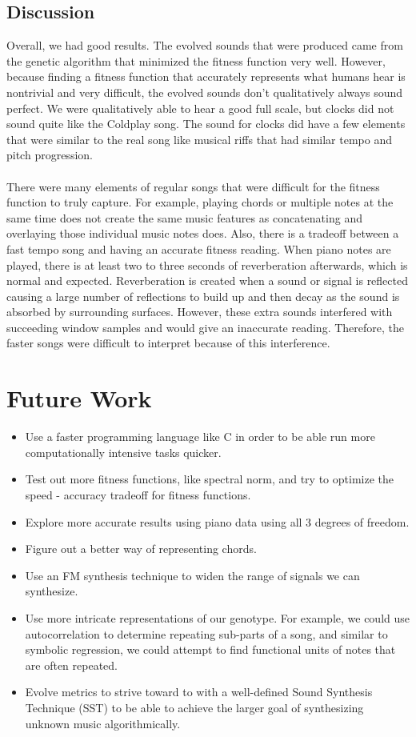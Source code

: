 \documentclass{pnastwo}
\begin{document}
\begin{article}
\subsection{Discussion}
Overall, we had good results. The evolved sounds that were produced came from the genetic algorithm that minimized the fitness function very well. However, because finding a fitness function that accurately represents what humans hear is nontrivial and very difficult, the evolved sounds don't qualitatively always sound perfect. We were qualitatively able to hear a good full scale, but clocks did not sound quite like the Coldplay song. The sound for clocks did have a few elements that were similar to the real song like musical riffs that had similar tempo and pitch progression.\\
\\
There were many elements of regular songs that were difficult for the fitness function to truly capture. For example, playing chords or multiple notes at the same time does not create the same music features as concatenating and overlaying those individual music notes does. Also, there is a tradeoff between a fast tempo song and having an accurate fitness reading. When piano notes are played, there is at least two to three seconds of reverberation afterwards, which is normal and expected. Reverberation is created when a sound or signal is reflected causing a large number of reflections to build up and then decay as the sound is absorbed by surrounding surfaces. However, these extra sounds interfered with succeeding window samples and would give an inaccurate reading. Therefore, the faster songs were difficult to interpret because of this interference. 
\section{Future Work}
\begin{itemize}
\item Use a faster programming language like C in order to be able run more computationally intensive tasks quicker.
\item Test out more fitness functions, like spectral norm, and try to optimize the speed - accuracy tradeoff for fitness functions.
\item Explore more accurate results using piano data using all 3 degrees of freedom.
\item Figure out a better way of representing chords.
\item Use an FM synthesis technique to widen the range of signals we can synthesize. 
\item Use more intricate representations of our genotype. For example, we could use autocorrelation to determine repeating sub-parts of a song, and similar to symbolic regression, we could attempt to find functional units of notes that are often repeated.  
\item Evolve metrics to strive toward to with a well-defined Sound Synthesis Technique (SST) to be able to achieve the larger goal of synthesizing unknown music algorithmically. 
\end{itemize}

\end{article}
\end{document}
